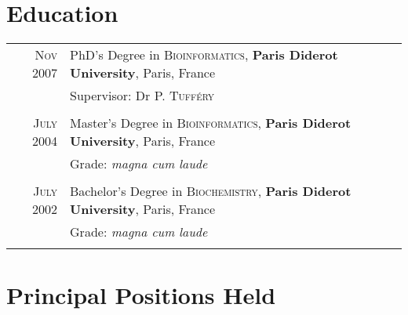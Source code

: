 \documentclass[a4paper,10pt]{article}
\begin{document}
\section{Education}
\begin{tabular}{rl}

  \textsc{Nov} 2007 & PhD's Degree in \textsc{Bioinformatics}, \textbf{Paris Diderot University}, Paris, France\\
  & \small Supervisor: Dr P. \textsc{Tufféry}\\
  &\\

  \textsc{July} 2004 & Master's Degree in \textsc{Bioinformatics}, \textbf{Paris Diderot University}, Paris, France\\
  & \small Grade: \emph{magna cum laude}\\
  &\\

  \textsc{July} 2002 & Bachelor's Degree in \textsc{Biochemistry}, \textbf{Paris Diderot University}, Paris, France\\
  & \small Grade: \emph{magna cum laude}\\
  &\\
\end{tabular}


\section{Principal Positions Held}
\end{document}
